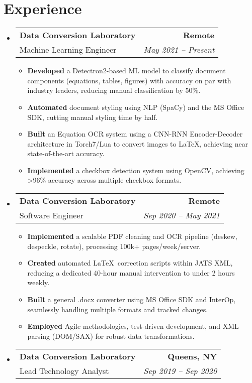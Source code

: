 \documentclass[a4paper]{article}
\makeatletter
\newcommand{\TwoRowSubheading}[4]{
  \item \begin{tabular*}{.95\textwidth}{@{}l @{\extracolsep{\fill}} r@{}}
    \textbf{#1} & \textbf{#2} \\
    {\color{gray}#3} & {\itshape #4} \\
  \end{tabular*}
}
\makeatother
\begin{document}
\section{Experience}
\begin{itemize}[leftmargin=*,label=]

\TwoRowSubheading
{Data Conversion Laboratory}
{Remote}
{Machine Learning Engineer}
{May 2021 -- Present}

\begin{itemize}[leftmargin=1em,rightmargin=1em,label=]
    \item \textbf{Developed} a Detectron2-based ML model to classify document components (equations, tables, figures) with accuracy on par with industry leaders, reducing manual classification by 50\%.
    \item \textbf{Automated} document styling using NLP (SpaCy) and the MS Office SDK, cutting manual styling time by half.
    \item \textbf{Built} an Equation OCR system using a CNN-RNN Encoder-Decoder architecture in Torch7/Lua to convert images to \LaTeX, achieving near state-of-the-art accuracy.
    \item \textbf{Implemented} a checkbox detection system using OpenCV, achieving >96\% accuracy across multiple checkbox formats.
\end{itemize}

\TwoRowSubheading
{Data Conversion Laboratory}
{Remote}
{Software Engineer}
{Sep 2020 -- May 2021}

\begin{itemize}[leftmargin=1em,rightmargin=1em,label=]
    \item \textbf{Implemented} a scalable PDF cleaning and OCR pipeline (deskew, despeckle, rotate), processing 100k+ pages/week/server.
    \item \textbf{Created} automated \LaTeX\ correction scripts within JATS XML, reducing a dedicated 40-hour manual intervention to under 2 hours weekly.
    \item \textbf{Built} a general .docx converter using MS Office SDK and InterOp, seamlessly handling multiple formats and tracked changes.
    \item \textbf{Employed} Agile methodologies, test-driven development, and XML parsing (DOM/SAX) for robust data transformations.
\end{itemize}

\TwoRowSubheading
{Data Conversion Laboratory}
{Queens, NY}
{Lead Technology Analyst}
{Sep 2019 -- Sep 2020}


\end{itemize}
\end{document}
